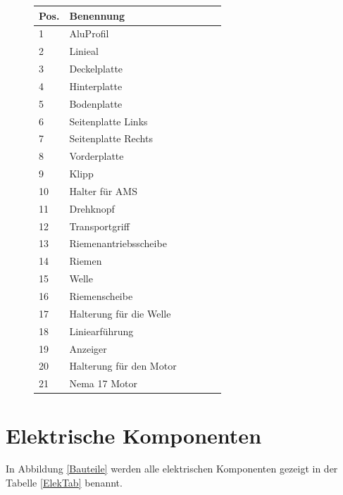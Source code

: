 \begin{figure}[htp]
	\begin{center}
		\fontsize{8}{10}\selectfont
		\begin{tabularx}{\textwidth}{|p{0.4cm}|X|X|X|X|X|} 
			\hline 
			\textbf{Pos.} &  \textbf{Benennung} \\ \hline
			1 & AluProfil   \\ \hline
			2 & Linieal   \\ \hline
			3 & Deckelplatte   \\ \hline
			4 & Hinterplatte   \\ \hline
			5 & Bodenplatte   \\ \hline
			6 & Seitenplatte Links \\ \hline
			7 & Seitenplatte Rechts  \\ \hline
			8 & Vorderplatte  \\ \hline
			9 & Klipp  \\ \hline
			10 & Halter für AMS  \\ \hline
			11 & Drehknopf  \\ \hline
			12 & Transportgriff  \\ \hline
			13 & Riemenantriebsscheibe  \\ \hline
			14 & Riemen  \\ \hline
			15 & Welle  \\ \hline
			16 & Riemenscheibe  \\ \hline
			17 & Halterung für die Welle  \\ \hline
			18 & Liniearführung  \\ \hline
			19 & Anzeiger  \\ \hline
			20 & Halterung für den Motor  \\ \hline
			21 & Nema 17 Motor  \\ \hline		
				
		\end{tabularx}
			\label{BauTab}
	\end{center}
\end{figure}


\section{Elektrische Komponenten}
In Abbildung \ref{Bauteile} werden alle elektrischen Komponenten gezeigt in der Tabelle \ref{ElekTab} benannt.

